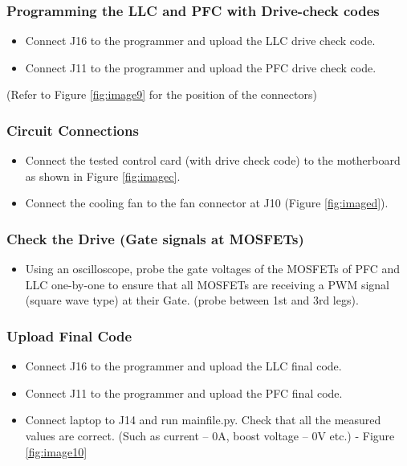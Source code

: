 \subsubsection{Programming the LLC and PFC with Drive-check codes}
\begin{itemize}
    \item Connect J16 to the programmer and upload the LLC drive check code.
    \item Connect J11 to the programmer and upload the PFC drive check code.
\end{itemize}
(Refer to Figure \ref*{fig:image9} for the position of the connectors)

\subsubsection{Circuit Connections}
\begin{itemize}
    \item Connect the tested control card (with drive check code) to the motherboard as shown in Figure \ref*{fig:imagec}.
    \item Connect the cooling fan to the fan connector at J10 (Figure \ref{fig:imaged}).
\end{itemize}

\subsubsection{Check the Drive (Gate signals at MOSFETs)}
\begin{itemize}
    \item Using an oscilloscope, probe the gate voltages of the MOSFETs of PFC and LLC one-by-one to ensure that all MOSFETs are receiving a PWM signal (square wave type) at their Gate. (probe between 1st and 3rd legs).
\end{itemize}

\subsubsection{Upload Final Code}
\begin{itemize}
    \item Connect J16 to the programmer and upload the LLC final code. 
    \item Connect J11 to the programmer and upload the PFC final code.
    \item Connect laptop to J14 and run mainfile.py. Check that all the measured values are correct. (Such as current – 0A, boost voltage – 0V etc.) - Figure \ref{fig:image10}
\end{itemize}


